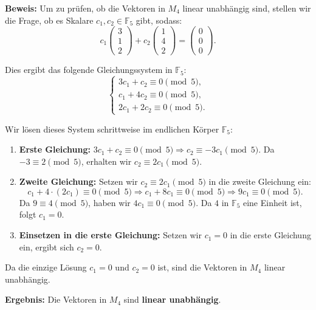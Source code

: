 \documentclass[11pt]{article}
\begin{document}
\textbf{Beweis:} Um zu prüfen, ob die Vektoren in \( M_4 \) linear unabhängig sind, stellen wir die Frage, ob es Skalare \( c_1, c_2 \in \mathbb{F}_5 \) gibt, sodass:
\[
c_1 \begin{pmatrix} 3 \\ 1 \\ 2 \end{pmatrix} + c_2 \begin{pmatrix} 1 \\ 4 \\ 2 \end{pmatrix} = \begin{pmatrix} 0 \\ 0 \\ 0 \end{pmatrix}.
\]

Dies ergibt das folgende Gleichungssystem in \( \mathbb{F}_5 \):
\[
\begin{cases}
3c_1 + c_2 \equiv 0 \pmod{5}, \\
c_1 + 4c_2 \equiv 0 \pmod{5}, \\
2c_1 + 2c_2 \equiv 0 \pmod{5}.
\end{cases}
\]

Wir lösen dieses System schrittweise im endlichen Körper \( \mathbb{F}_5 \):

\begin{enumerate}
    \item \textbf{Erste Gleichung:} \( 3c_1 + c_2 \equiv 0 \pmod{5} \Rightarrow c_2 \equiv -3c_1 \pmod{5} \). Da \( -3 \equiv 2 \pmod{5} \), erhalten wir \( c_2 \equiv 2c_1 \pmod{5} \).

    \item \textbf{Zweite Gleichung:} Setzen wir \( c_2 \equiv 2c_1 \pmod{5} \) in die zweite Gleichung ein:
    \[
    c_1 + 4 \cdot (2c_1) \equiv 0 \pmod{5} \Rightarrow c_1 + 8c_1 \equiv 0 \pmod{5} \Rightarrow 9c_1 \equiv 0 \pmod{5}.
    \]
    Da \( 9 \equiv 4 \pmod{5} \), haben wir \( 4c_1 \equiv 0 \pmod{5} \). Da \( 4 \) in \( \mathbb{F}_5 \) eine Einheit ist, folgt \( c_1 = 0 \).

    \item \textbf{Einsetzen in die erste Gleichung:} Setzen wir \( c_1 = 0 \) in die erste Gleichung ein, ergibt sich \( c_2 = 0 \).
\end{enumerate}

Da die einzige Lösung \( c_1 = 0 \) und \( c_2 = 0 \) ist, sind die Vektoren in \( M_4 \) linear unabhängig.

\textbf{Ergebnis:} Die Vektoren in \( M_4 \) sind \textbf{linear unabhängig}.



\end{document}
